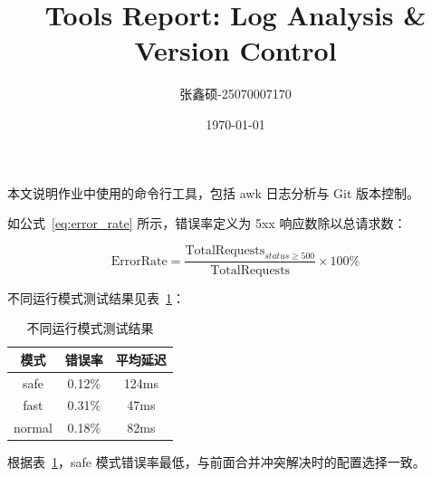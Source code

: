 \documentclass[a4paper,10pt]{article}
\begin{document}
\title{Tools Report: Log Analysis \& Version Control}
\author{张鑫硕-25070007170}
\date{\today}
\maketitle

本文说明作业中使用的命令行工具，包括 awk 日志分析与 Git 版本控制。

如公式~\ref{eq:error_rate} 所示，错误率定义为 5xx 响应数除以总请求数：

\begin{equation}
\text{ErrorRate} = \frac{\text{TotalRequests}_{status\geq500}}{\text{TotalRequests}} \times 100\%
\label{eq:error_rate}
\end{equation}

不同运行模式测试结果见表~\ref{tab:mode_test}：

\begin{table}[htbp]
    \centering
    \caption{不同运行模式测试结果}
    \label{tab:mode_test}
    \begin{tabular}{|c|c|c|}
        \hline
        模式 & 错误率 & 平均延迟 \\
        \hline
        safe & 0.12\% & 124ms \\
        fast & 0.31\% & 47ms \\
        normal & 0.18\% & 82ms \\
        \hline
    \end{tabular}
\end{table}

根据表~\ref{tab:mode_test}，safe 模式错误率最低，与前面合并冲突解决时的配置选择一致。
\end{document}
